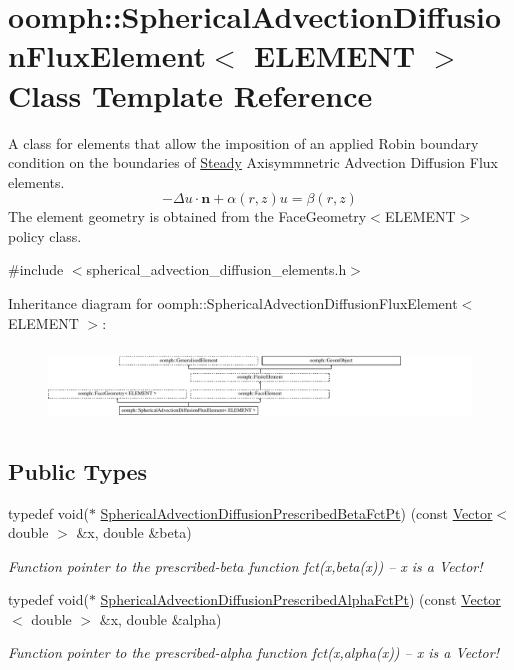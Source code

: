 \hypertarget{classoomph_1_1SphericalAdvectionDiffusionFluxElement}{}\section{oomph\+:\+:Spherical\+Advection\+Diffusion\+Flux\+Element$<$ E\+L\+E\+M\+E\+NT $>$ Class Template Reference}
\label{classoomph_1_1SphericalAdvectionDiffusionFluxElement}


A class for elements that allow the imposition of an applied Robin boundary condition on the boundaries of \hyperlink{classoomph_1_1Steady}{Steady} Axisymmnetric Advection Diffusion Flux elements. \[ -\Delta u \cdot \mathbf{n} + \alpha(r,z) u = \beta(r,z) \] The element geometry is obtained from the Face\+Geometry$<$\+E\+L\+E\+M\+E\+N\+T$>$ policy class.  




{\ttfamily \#include $<$spherical\+\_\+advection\+\_\+diffusion\+\_\+elements.\+h$>$}

Inheritance diagram for oomph\+:\+:Spherical\+Advection\+Diffusion\+Flux\+Element$<$ E\+L\+E\+M\+E\+NT $>$\+:\begin{figure}[H]
\begin{center}
\leavevmode
\includegraphics[height=1.996435cm]{classoomph_1_1SphericalAdvectionDiffusionFluxElement}
\end{center}
\end{figure}
\subsection*{Public Types}
\begin{DoxyCompactItemize}
\item 
typedef void($\ast$ \hyperlink{classoomph_1_1SphericalAdvectionDiffusionFluxElement_a1fe86f85817dd5621ab510d37b3a8ce8}{Spherical\+Advection\+Diffusion\+Prescribed\+Beta\+Fct\+Pt}) (const \hyperlink{classoomph_1_1Vector}{Vector}$<$ double $>$ \&x, double \&beta)
\begin{DoxyCompactList}\small\item\em Function pointer to the prescribed-\/beta function fct(x,beta(x)) -- x is a Vector! \end{DoxyCompactList}\item 
typedef void($\ast$ \hyperlink{classoomph_1_1SphericalAdvectionDiffusionFluxElement_aabc503a4eeac639334283e7297b88423}{Spherical\+Advection\+Diffusion\+Prescribed\+Alpha\+Fct\+Pt}) (const \hyperlink{classoomph_1_1Vector}{Vector}$<$ double $>$ \&x, double \&alpha)
\begin{DoxyCompactList}\small\item\em Function pointer to the prescribed-\/alpha function fct(x,alpha(x)) -- x is a Vector! \end{DoxyCompactList}\end{DoxyCompactItemize}
